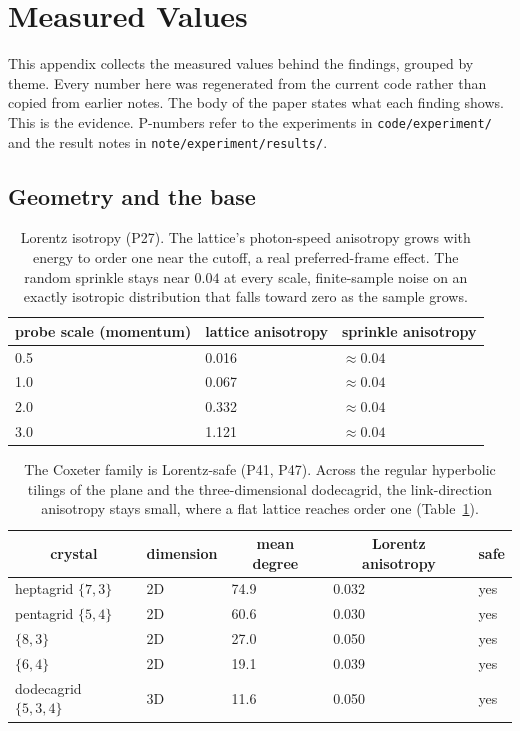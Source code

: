 \section{Measured Values}
\label{sec:appendix}

This appendix collects the measured values behind the findings, grouped by theme. Every number
here was regenerated from the current code rather than copied from earlier notes. The body of the
paper states what each finding shows. This is the evidence. P-numbers refer to the experiments in
\texttt{code/experiment/} and the result notes in \texttt{note/experiment/results/}.

\subsection{Geometry and the base}

\begin{table}[H]
\centering
\small
\begin{tabular}{lll}
\toprule
\multicolumn{1}{c}{probe scale (momentum)} & \multicolumn{1}{c}{lattice anisotropy} & \multicolumn{1}{c}{sprinkle anisotropy} \\
\midrule
0.5 & 0.016 & $\approx 0.04$ \\
1.0 & 0.067 & $\approx 0.04$ \\
2.0 & 0.332 & $\approx 0.04$ \\
3.0 & 1.121 & $\approx 0.04$ \\
\bottomrule
\end{tabular}
\caption{\label{tab:lorentz}Lorentz isotropy (P27). The lattice's photon-speed anisotropy grows with energy to order one near the cutoff, a real preferred-frame effect. The random sprinkle stays near $0.04$ at every scale, finite-sample noise on an exactly isotropic distribution that falls toward zero as the sample grows.}
\end{table}

\begin{table}[H]
\centering
\small
\begin{tabular}{lllll}
\toprule
\multicolumn{1}{c}{crystal} & \multicolumn{1}{c}{dimension} & \multicolumn{1}{c}{mean degree} & \multicolumn{1}{c}{Lorentz anisotropy} & \multicolumn{1}{c}{safe} \\
\midrule
heptagrid $\{7,3\}$ & 2D & 74.9 & 0.032 & yes \\
pentagrid $\{5,4\}$ & 2D & 60.6 & 0.030 & yes \\
$\{8,3\}$ & 2D & 27.0 & 0.050 & yes \\
$\{6,4\}$ & 2D & 19.1 & 0.039 & yes \\
dodecagrid $\{5,3,4\}$ & 3D & 11.6 & 0.050 & yes \\
\bottomrule
\end{tabular}
\caption{The Coxeter family is Lorentz-safe (P41, P47). Across the regular hyperbolic tilings of the plane and the three-dimensional dodecagrid, the link-direction anisotropy stays small, where a flat lattice reaches order one (Table~\ref{tab:lorentz}).}
\end{table}


